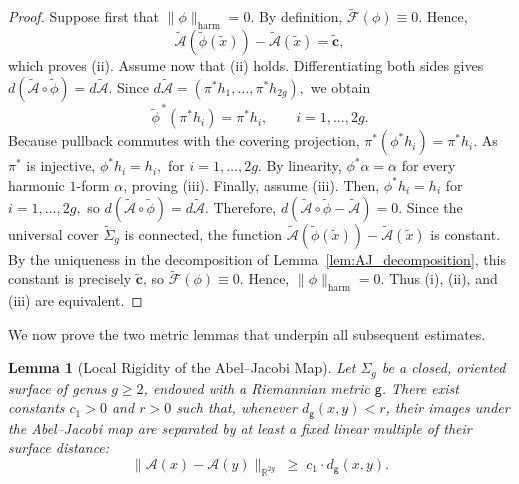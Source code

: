 \documentclass[11pt]{article}
\newtheorem{lemma}[theorem]{Lemma}
\theoremstyle{definition}
\begin{document}
	\begin{proof}
		Suppose first that $\|\phi\|_{\mathrm{harm}}=0.$ By definition, $\widetilde{\mathcal F}
		(\phi)\equiv0.$ Hence, 
		\[
		\widetilde{\mathcal A}(\widetilde\phi(\tilde x)) - \widetilde{\mathcal A}(\tilde x)
		= \widetilde{\mathbf c},
		\]
		which proves (ii). Assume now that (ii) holds. Differentiating both sides gives
		$d(\widetilde{\mathcal A}\circ\widetilde\phi) = d\widetilde{\mathcal A}.$
		Since $d\widetilde{\mathcal A} = (\pi^*h_1,\ldots,\pi^*h_{2g}),$ we obtain
		\[
		\widetilde\phi^{\,*}(\pi^*h_i)
		=
		\pi^*h_i,
		\qquad
		i=1,\ldots,2g.
		\]
		Because pullback commutes with the covering projection, $\pi^*(\phi^*h_i) =
		\pi^*h_i.$ As $\pi^*$ is injective, $\phi^*h_i=h_i,$ for $i=1,\ldots,2g.$ By
		linearity, $\phi^*\alpha=\alpha$ for every harmonic $1$-form $\alpha$, proving
		(iii). Finally, assume (iii). Then, $\phi^*h_i=h_i$ for $i=1,\ldots,2g,$ so
		$d(\widetilde{\mathcal A}\circ\widetilde\phi) = d\widetilde{\mathcal A}.$
		Therefore, $d\left(\widetilde{\mathcal A}\circ\widetilde\phi -
		\widetilde{\mathcal A}\right) =0.$ Since the universal cover
		$\widetilde{\Sigma}_g$ is connected, the function $\widetilde{\mathcal
			A}(\widetilde\phi(\tilde x)) - \widetilde{\mathcal A}(\tilde x)$ is constant.
		By the uniqueness in the decomposition of Lemma~\ref{lem:AJ_decomposition}, this
		constant is precisely $\widetilde{\mathbf c}$, so $\widetilde{\mathcal
			F}(\phi)\equiv0.$ Hence, $\|\phi\|_{\mathrm{harm}}=0.$ Thus (i), (ii), and (iii)
		are equivalent.
	\end{proof}
	
	We now prove the two metric lemmas that underpin all subsequent estimates.
	
	\begin{lemma}[Local Rigidity of the Abel--Jacobi Map]
		\label{lem:rigidity}
		Let $\Sigma_g$ be a closed, oriented surface of genus $g \ge 2$, endowed with a
		Riemannian metric $\mathsf g$. There exist constants $c_1 > 0$ and $r > 0$ such
		that, whenever $d_{\mathsf g}(x,y) < r$, their images under the Abel--Jacobi map
		are separated by at least a fixed linear multiple of their surface distance:
		\[
		\|\mathcal A(x)-\mathcal A(y)\|_{\mathbb R^{2g}} \;\ge\; c_1 \cdot
		d_{\mathsf g}(x,y).
		\]
	\end{lemma}
	
\end{document}
